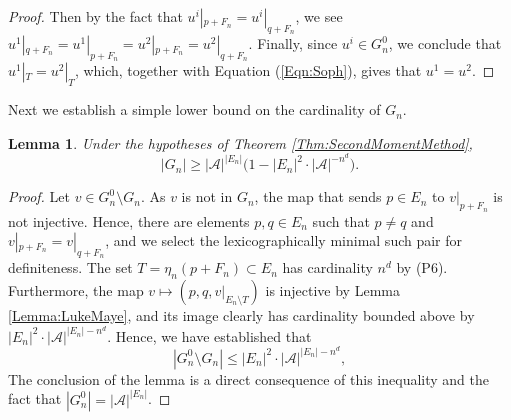 \documentclass[12pt]{amsart}
\newtheorem{lemma}[theorem]{Lemma}
\theoremstyle{definition}
\begin{document}
\begin{proof}
Then by the fact that $u^i|_{p+F_n} = u^i|_{q+F_n}$, we see $u^1|_{q+F_n} = u^1|_{p+F_n} = u^2|_{p+F_n} = u^2|_{q+F_n}$. Finally, since $u^i \in G_n^0$, we conclude that $u^1|_T = u^2|_T$, which, together with Equation (\ref{Eqn:Soph}), gives that $u^1 = u^2$.
\end{proof}

Next we establish a simple lower bound on the cardinality of $G_n$.
\begin{lemma} \label{Lemma:Halloween}
Under the hypotheses of Theorem \ref{Thm:SecondMomentMethod},
\begin{equation*}
|G_n| \geq  |\mathcal{A}|^{|E_n|} \bigl( 1 - |E_n|^2 \cdot |\mathcal{A}|^{-n^d} \bigr).
\end{equation*}
\end{lemma}
\begin{proof}
Let $v \in G_n^0 \setminus G_n$. As $v$ is not in $G_n$, the map that sends $p \in E_n$ to $v|_{p+F_n}$ is not injective. Hence, there are elements $p,q \in E_n$ such that $p \neq q$ and $v|_{p+F_n} = v|_{q+F_n}$, and we select the lexicographically minimal such pair for definiteness. The set $T = \eta_n(p+F_n) \subset E_n$ has cardinality $n^d$ by (P6). Furthermore, the map $v \mapsto (p,q,v|_{E_n \setminus T})$ is injective by Lemma \ref{Lemma:LukeMaye}, and its image clearly has cardinality bounded above by $|E_n|^2 \cdot |\mathcal{A}|^{|E_n|-n^d}$. Hence, we have established that
\begin{equation*} %
|G_n^0 \setminus G_n| \leq |E_n|^2 \cdot |\mathcal{A}|^{|E_n|-n^d},
\end{equation*}
The conclusion of the lemma is a direct consequence of this inequality and the fact that $|G_n^0| = |\mathcal{A}|^{|E_n|}$.
\end{proof}
\end{document}
